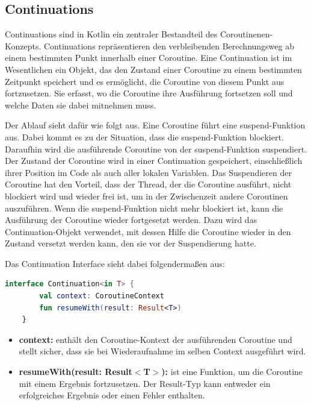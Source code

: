 \documentclass[fontsize=12pt,paper=a4,twoside=semi,parskip=half-,headsepline,headinclude]{scrreprt}
\begin{document}
\subsection{Continuations}

Continuations sind in Kotlin ein zentraler Bestandteil des Coroutinenen-Konzepts. Continuations repräsentieren den verbleibenden Berechnungsweg ab einem bestimmten Punkt innerhalb einer Coroutine. Eine Continuation ist im Wesentlichen ein Objekt, das den Zustand einer Coroutine zu einem bestimmten Zeitpunkt speichert und es ermöglicht, die Coroutine von diesem Punkt aus fortzusetzen. Sie erfasst, wo die Coroutine ihre Ausführung fortsetzen soll und welche Daten sie dabei mitnehmen muss.

Der Ablauf sieht dafür wie folgt aus. Eine Coroutine führt eine suspend-Funktion aus. Dabei kommt es zu der Situation, dass die suspend-Funktion blockiert. Daraufhin wird die ausführende Coroutine von der suspend-Funktion suspendiert. Der Zustand der Coroutine wird in einer Continuation gespeichert, einschließlich ihrer Position im Code als auch aller lokalen Variablen. Das Suspendieren der Coroutine hat den Vorteil, dass der Thread, der die Coroutine ausführt, nicht blockiert wird und wieder frei ist, um in der Zwischenzeit andere Coroutinen auszuführen. Wenn die suspend-Funktion nicht mehr blockiert ist, kann die Ausführung der Coroutine wieder fortgesetzt werden. Dazu wird das Continuation-Objekt verwendet, mit dessen Hilfe die Coroutine wieder in den Zustand versetzt werden kann, den sie vor der Suspendierung hatte.

Das Continuation Interface sieht dabei folgendermaßen aus:

\begin{lstlisting}[language=Kotlin]
	interface Continuation<in T> {
		val context: CoroutineContext
		fun resumeWith(result: Result<T>)
	}
\end{lstlisting}

\begin{itemize}
	\item \textbf{context:} enthält den Coroutine-Kontext der ausführenden Coroutine und stellt sicher, dass sie bei Wiederaufnahme im selben Context ausgeführt wird.
	\item \textbf{resumeWith(result: Result$<$T$>$):} ist eine Funktion, um die Coroutine mit einem Ergebnis fortzusetzen. Der Result-Typ kann entweder ein erfolgreiches Ergebnis oder einen Fehler enthalten.
\end{itemize}
\end{document}
